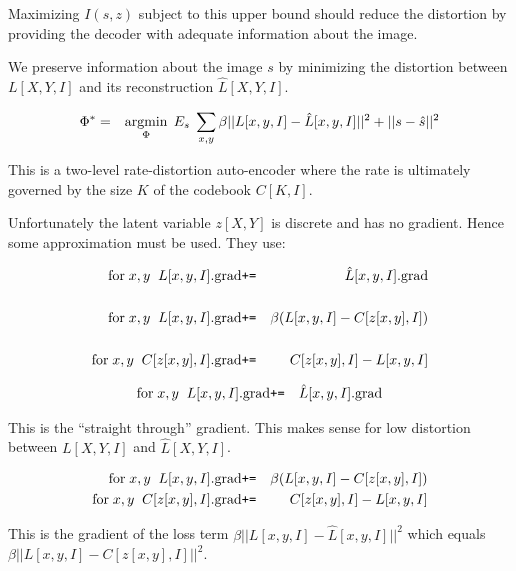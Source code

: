 {\vfill
Maximizing $I(s,z)$ subject to this upper bound should reduce the distortion by providing the decoder with adequate information
about the image.


We preserve information about the image $s$ by minimizing the distortion between $L[X,Y,I]$ and its reconstruction $\hat{L}[X,Y,I]$.

\vfill
\begin{eqnarray*}
\Phi^* & = & \operatorname*{argmin}_\Phi \;E_s\; \sum_{x,y} \beta||L[x,y,I] - \hat{L}[x,y,I]||^2 + ||s -\hat{s}||^2
\end{eqnarray*}

\vfill
This is a two-level rate-distortion auto-encoder where the rate is ultimately governed by the size $K$ of the codebook $C[K,I]$.


Unfortunately the latent variable $z[X,Y]$ is discrete and has no gradient.  Hence some approximation must be used.  They use:

\begin{eqnarray*}
\mathrm{for}\;x,y\;\;L[x,y,I].\mathrm{grad} & \mbox{\tt +=} & \hat{L}[x,y,I].\mathrm{grad} \\
\\
\mathrm{for}\;x,y\;\;L[x,y,I].\mathrm{grad} & \mbox{\tt +=} & \beta({L}[x,y,I]- C[z[x,y],I]) \\
\\
\mathrm{for}\;x,y\;\;C[z[x,y],I].\mathrm{grad} & \mbox{\tt +=} & C[z[x,y],I] - L[x,y,I]
\end{eqnarray*}


\begin{eqnarray*}
\mathrm{for}\;x,y\;\;L[x,y,I].\mathrm{grad} & \mbox{\tt +=} & \hat{L}[x,y,I].\mathrm{grad}
\end{eqnarray*}

\vfill
This is the ``straight through'' gradient.  This makes sense for low distortion between $L[X,Y,I]$ and $\hat{L}[X,Y,I]$.


\begin{eqnarray*}
\mathrm{for}\;x,y\;\;L[x,y,I].\mathrm{grad} & \mbox{\tt +=} & \beta({L}[x,y,I]- C[z[x,y],I]) \\
\mathrm{for}\;x,y\;\;C[z[x,y],I].\mathrm{grad} & \mbox{\tt +=} & C[z[x,y],I] - L[x,y,I]
\end{eqnarray*}

\vfill
This is the gradient of the loss term $\beta||L[x,y,I] - \hat{L}[x,y,I]||^2$ which equals $\beta||L[x,y,I] - C[z[x,y],I]||^2$.

}
